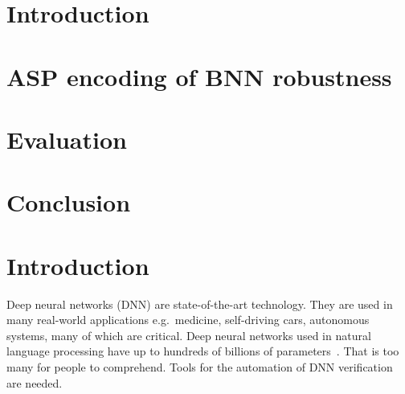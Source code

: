 \documentclass[
    digital,
    color,
    oneside,
    sansbold,
    lot,
    nolof
]{fithesis}
\begin{document}

\chapter{Introduction}




\chapter{ASP encoding of BNN robustness}

\chapter{Evaluation}

\chapter{Conclusion}


\chapter{Introduction}


Deep neural networks (DNN) are state-of-the-art technology. They are used in many
real-world applications e.g.\ medicine, self-driving cars, autonomous systems,
many of which are critical. %
Deep neural networks used in natural language processing have up to hundreds of
billions of parameters~\cite{2021arXiv210901652W}.
That is too many for people to comprehend. Tools for the automation
of DNN verification are needed.
\end{document}
